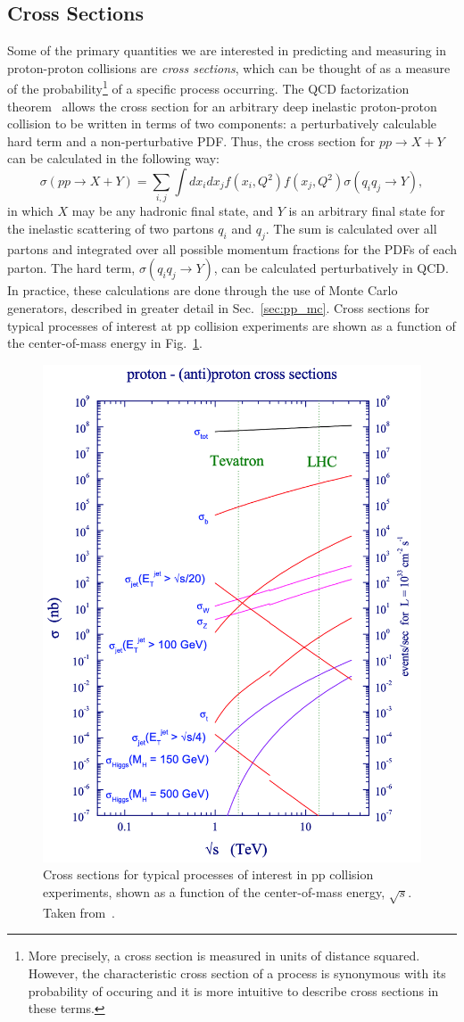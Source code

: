 \subsection{Cross Sections}
Some of the primary quantities we are interested in predicting and measuring in proton-proton collisions are \emph{cross sections}, which can be thought of as a measure of the probability\footnote{More precisely, a cross section is measured in units of distance squared. However, the characteristic cross section of a process is synonymous with its probability of occuring and it is more intuitive to describe cross sections in these terms.} of a specific process occurring.
The QCD factorization theorem~\cite{Collins:1989gx} allows the cross section for an arbitrary deep inelastic proton-proton collision to be written in terms of two components: a perturbatively calculable hard term and a non-perturbative PDF.
Thus, the cross section for $pp \to X + Y$ can be calculated in the following way:
\begin{equation} 
    \sigma(pp \to X + Y) = \sum_{i,j} \int dx_i dx_j f(x_i, Q^2) f(x_j, Q^2) \sigma(q_i q_j \to Y),
\end{equation}
in which $X$ may be any hadronic final state, and $Y$ is an arbitrary final state for the inelastic scattering of two partons $q_i$ and $q_j$.
The sum is calculated over all partons and integrated over all possible momentum fractions for the PDFs of each parton.
The hard term, $\sigma(q_i q_j \to Y)$, can be calculated perturbatively in QCD.
In practice, these calculations are done through the use of Monte Carlo generators, described in greater detail in Sec.~\ref{sec:pp_mc}.
Cross sections for typical processes of interest at pp collision experiments are shown as a function of the center-of-mass energy in Fig.~\ref{fig:pp_xs}.
\begin{figure}[htbp!]
    \centering
    \includegraphics[width=0.6\linewidth]{figures/physics_of_pp/pp_cross_sections.png}
    \caption{Cross sections for typical processes of interest in pp collision experiments, shown as a function of the center-of-mass energy, $\sqrt{s}$. Taken from~\cite{Campbell:2006wx}.}
    \label{fig:pp_xs}
\end{figure}

